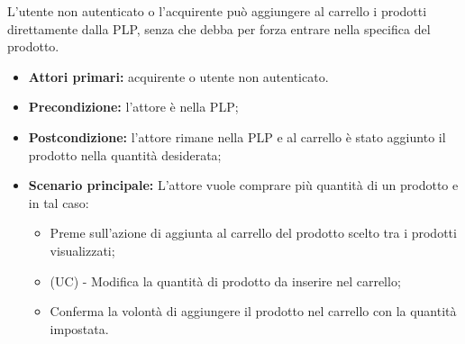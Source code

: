 L'utente non autenticato o l'acquirente può aggiungere al carrello i prodotti direttamente dalla PLP, senza che debba per forza entrare nella  specifica del prodotto.
\begin{itemize}
    \item \textbf{Attori primari:} acquirente o  utente non autenticato.
    \item \textbf{Precondizione:} l'attore è nella PLP;
    \item \textbf{Postcondizione:} l'attore rimane nella PLP e al carrello è stato aggiunto il prodotto nella quantità desiderata;
    \item \textbf{Scenario principale:} L'attore vuole comprare più quantità di un prodotto e in tal caso:
    \begin{itemize}
        \item Preme sull'azione di aggiunta al carrello del prodotto scelto tra i prodotti visualizzati;
          \item (UC) - Modifica la quantità di prodotto da inserire nel carrello;
        \item Conferma la volontà di aggiungere il prodotto nel carrello con la quantità impostata.
    \end{itemize}
\end{itemize}
